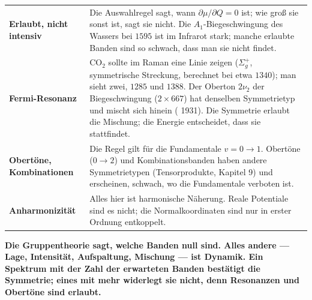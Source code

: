 \begin{warnung}
\begin{center}
{\small
\renewcommand{\arraystretch}{1.5}
\begin{tabular}{@{}P{3.2cm}P{5.4cm}@{}}
\toprule
\textbf{Erlaubt, nicht intensiv} & Die Auswahlregel sagt, wann $\partial\mu/\partial Q = 0$ ist; wie groß sie sonst ist, sagt sie nicht. Die $A_1$-Biegeschwingung des Wassers bei $1595$ ist im Infrarot stark; manche erlaubte Banden sind so schwach, dass man sie nicht findet.\\
\textbf{Fermi-Resonanz} & $\mathrm{CO_2}$ sollte im Raman eine Linie zeigen ($\Sigma_g^{+}$, symmetrische Streckung, berechnet bei etwa $1340$); man sieht zwei, $1285$ und $1388$. Der Oberton $2\nu_2$ der Biegeschwingung ($2\times667$) hat denselben Symmetrietyp und mischt sich hinein ( 1931). Die Symmetrie erlaubt die Mischung; die Energie entscheidet, dass sie stattfindet.\\
\textbf{Obertöne, Kombinationen} & Die Regel gilt für die Fundamentale $v = 0\to1$. Obertöne ($0\to2$) und Kombinationsbanden haben andere Symmetrietypen (Tensorprodukte, Kapitel 9) und erscheinen, schwach, wo die Fundamentale verboten ist.\\
\textbf{Anharmonizität} & Alles hier ist harmonische Näherung. Reale Potentiale sind es nicht; die Normalkoordinaten sind nur in erster Ordnung entkoppelt.\\
\bottomrule
\end{tabular}}
\end{center}

\begin{center}
\begin{minipage}{0.9\textwidth}
\textbf{Die Gruppentheorie sagt, welche Banden null sind. Alles andere --- Lage, Intensität, Aufspaltung, Mischung --- ist Dynamik. Ein Spektrum mit der Zahl der erwarteten Banden bestätigt die Symmetrie; eines mit mehr widerlegt sie nicht, denn Resonanzen und Obertöne sind erlaubt.}
\end{minipage}
\end{center}

\begin{center}
\begin{minipage}{0.88\textwidth}
\end{minipage}
\end{center}
\end{warnung}

